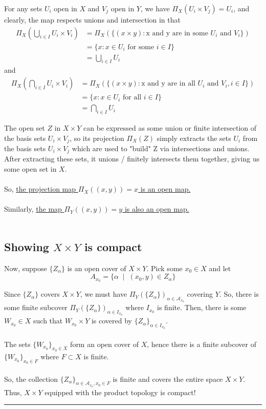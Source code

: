 \documentclass[twoside]{article}
\begin{document}
For any sets $U_i$ open in $X$ and $V_j$ open in $Y$, we have $\Pi_X(U_i \times V_j) = U_i$, and clearly, the map respects unions and intersection in that 
\begin{align*}
   \Pi_X\left(\bigcup_{i \in I} U_i \times V_i \right) &= \Pi_X (\{ (x \times y) : \text{x and y are in some } U_i \text{ and } V_i \}) \\
   &= \{x : x \in U_i \text{ for some } i \in I\} \\
   &= \bigcup_{i \in I} U_i
\end{align*}
and 
\begin{align*}
   \Pi_X\left(\bigcap_{i \in I} U_i \times V_i \right) &= \Pi_X (\{ (x \times y) : \text{x and y are in all } U_i \text{ and } V_i, i \in I \}) \\
   &= \{x : x \in U_i \text{ for all } i \in I\} \\
   &= \bigcap_{i \in I} U_i
\end{align*}

The open set $Z$ in $X \times Y$ can be expressed as some union or finite intersection of the basis sets $U_i \times V_j$, so its projection $\Pi_X(Z)$ simply extracts the sets $U_i$ from the basis sets $U_i \times V_j$ which are used to "build" Z via intersections and unions. After extracting these sets, it unions / finitely intersects them together, giving us some open set in $X$.
\\
\\
So, \underline{the projection map $\Pi_X((x,y)) = x$ is an open map.}
\\
\\
Similarly, \underline{the map $\Pi_Y((x,y)) = y$ is also an open map.}
\\
\\
\subsection*{Showing $X \times Y$ is compact}
Now, suppose $\{Z_{\alpha}\}$ is an open cover of $X \times Y$. Pick some $x_0 \in X$ and let 
\[ A_{x_0} = \{ \alpha \;\;|\;\; (x_0, y) \in Z_{\alpha} \} \]

Since $\{Z_{\alpha}\}$ covers $X \times Y$, we must have $\Pi_Y(\{Z_{\alpha}\})_{\alpha \in \mathcal{A}_{x_0}}$ covering $Y$. So, there is some finite subcover $\Pi_Y(\{Z_{\alpha}\})_{\alpha \in I_{x_0}}$ where $I_{x_0}$ is finite. Then, there is some $W_{x_0} \in X$ such that $W_{x_{0}} \times Y$ is covered by  $\{Z_{\alpha}\}_{\alpha \in I_{x_0}}$.
\\
\\
The sets $\{W_{x_0}\}_{x_0 \in X}$ form an open cover of $X$, hence there is a finite subcover of $\{W_{x_0}\}_{x_0 \in F}$ where $F \subset X$ is finite.
\\
\\
So, the collection $\{Z_{\alpha}\}_{\alpha \in \mathcal{A}_{x_0}, x_0 \in F}$ is finite and covers the entire space $X \times Y$. Thus, $X \times Y$ equipped with the product topology is compact!
\vskip 0.25cm
\hrule
\vskip 1cm 
\end{document}
